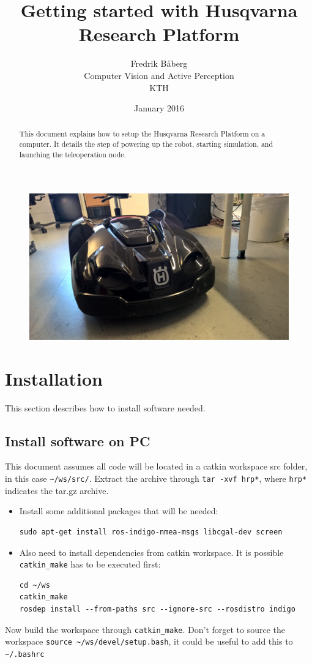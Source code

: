 \documentclass[]{article}
\title{Getting started with \linebreak Husqvarna Research Platform}
\author{Fredrik B\aa berg \\ \small{Computer Vision and Active Perception} \\ \small{KTH} }
\date{January 2016}
\begin{document}
\maketitle

\begin{abstract}
This document explains how to setup the Husqvarna Research Platform on a computer. It details the step of powering up the robot, starting simulation, and launching the teleoperation node.
\end{abstract}

\begin{figure}[h]
\includegraphics[width=12cm]{hrp.jpg}
\centering
\end{figure}

\section{Installation}
This section describes how to install software needed.

\subsection{Install software on PC}\label{sec:install_pc}
This document assumes all code will be located in a catkin workspace src folder, in this case \verb|~/ws/src/|. Extract the archive through \verb|tar -xvf hrp*|, where \verb|hrp*| indicates the tar.gz archive.
\begin{itemize}
\item Install some additional packages that will be needed:
\begin{verbatim}
sudo apt-get install ros-indigo-nmea-msgs libcgal-dev screen
\end{verbatim}
\item Also need to install dependencies from catkin workspace. It is possible \verb|catkin_make| has to be executed first:
\begin{verbatim}
cd ~/ws
catkin_make
rosdep install --from-paths src --ignore-src --rosdistro indigo
\end{verbatim}
\end{itemize}
Now build the workspace through \verb|catkin_make|. Don't forget to source the workspace \verb|source ~/ws/devel/setup.bash|, it could be useful to add this to \verb|~/.bashrc|
\end{document}
